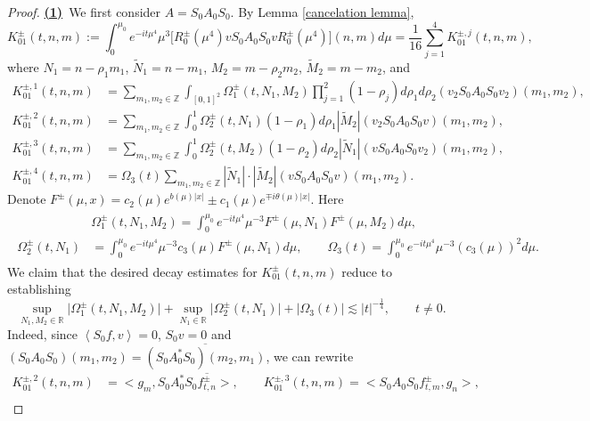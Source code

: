 \documentclass[reqno, 11pt]{amsart}
\newcommand\R{\mathbb{R}}
\newcommand\Z{\mathbb{Z}}
\numberwithin{equation}{section}
\begin{document}
\begin{proof}
{\underline{\bf(1)}}~We first consider $A=S_0A_0S_0$. By Lemma \ref{cancelation lemma},
$$K^{\pm}_{01}(t,n,m):=\int_{0}^{\mu_0}e^{-it\mu^4}\mu^3\big[R^{\pm}_0(\mu^4)vS_0A_{0}S_0vR^{\pm}_0(\mu^4)\big](n,m)d\mu=\frac{1}{16}\sum\limits_{j=1}^{4}K^{\pm,j}_{01}(t,n,m),$$
where $N_1=n-\rho_1m_1$, $\widetilde{N}_1=n-m_1$,
$M_2=m-\rho_2m_2$, $\widetilde{M}_2=m-m_2$, and 
\begin{align*}
K^{\pm,1}_{01}(t,n,m)&=\sum\limits_{m_1,m_2\in\Z}\int_{[0,1]^2}\Omega^{\pm}_1(t,N_1,M_2)\prod\limits_{j=1}^{2}(1-\rho_j)d\rho_1d\rho_2(v_2S_0A_0S_0v_2)(m_1,m_2),\\
K^{\pm,2}_{01}(t,n,m)&=\sum\limits_{m_1,m_2\in\Z}\int_{0}^{1}\Omega^{\pm}_2(t,N_1)(1-\rho_1)d\rho_1|\widetilde{M}_2|(v_2S_0A_0S_0v)(m_1,m_2),\\
K^{\pm,3}_{01}(t,n,m)&=\sum\limits_{m_1,m_2\in\Z}\int_{0}^{1}\Omega^{\pm}_2(t,M_2)(1-\rho_2)d\rho_2|\widetilde{N}_1|(vS_0A_0S_0v_2)(m_1,m_2),\\
K^{\pm,4}_{01}(t,n,m)&=\Omega_3(t)\sum\limits_{m_1,m_2\in\Z}|\widetilde{N}_1|\cdot|\widetilde{M}_2|(vS_0A_0S_0v)(m_1,m_2).
\end{align*}
Denote $F^{\pm}(\mu,x)=c_2(\mu)e^{b(\mu)|x|}\pm c_1(\mu)e^{\mp i\theta(\mu)|x|}$. Here
\begin{align}\label{expre of Omega}
\begin{split}
    &\Omega^{\pm}_{1}(t,N_1,M_2)=\int_{0}^{\mu_0}e^{-it\mu^4}\mu^{-3}F^{\pm}(\mu,N_1)F^{\pm}(\mu,M_2)d\mu,\\
\Omega^{\pm}_2(t,N_1)&=\int_{0}^{\mu_0}e^{-it\mu^4}\mu^{-3}c_3(\mu)F^{\pm}(\mu,N_1)d\mu,\qquad
\Omega_3(t)=\int_{0}^{\mu_0}e^{-it\mu^4}\mu^{-3}(c_3(\mu))^2d\mu.
\end{split}
\end{align}
We claim that the desired decay estimates for $K^{\pm}_{01}(t,n,m)$ reduce to establishing 
\begin{equation}\label{estim for Omega123}
\sup\limits_{N_1,M_2\in\R}
\big|\Omega_1^\pm(t,N_1,M_2)\big|
+
\sup_{N_1\in\R}
\big|\Omega_2^\pm(t,N_1)\big|
+
|\Omega_3(t)|
\lesssim |t|^{-\frac14},
\qquad t\neq0.
\end{equation}
Indeed, since $\left<S_0f,v\right>=0$, $S_0v=0$ and $(S_0A_0S_0)(m_1,m_2)=\overline{(S_0A^*_0S_0)(m_2,m_1)}$, we can rewrite 
\begin{align*}
K^{\pm,2}_{01}(t,n,m)&=\big<g_m, S_0A^*_0S_0\overline{f^{\pm}_{t,n}}\big>,\qquad 
K^{\pm,3}_{01}(t,n,m)=\big<S_0A_0S_0{f^{\pm}_{t,m}},g_n\big>,\\

\end{align*}
\end{proof}
\end{document}
